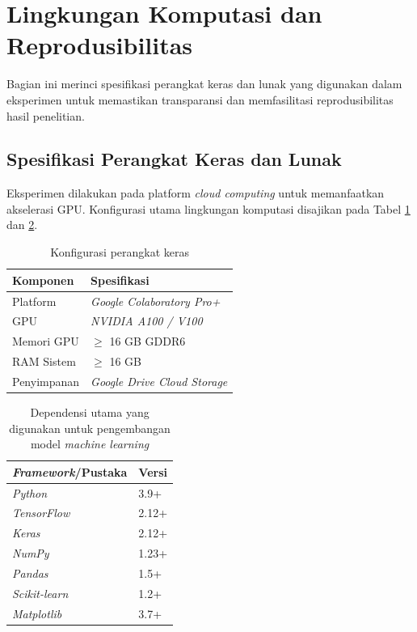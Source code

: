 \section{Lingkungan Komputasi dan Reprodusibilitas}

Bagian ini merinci spesifikasi perangkat keras dan lunak yang digunakan dalam eksperimen untuk memastikan transparansi dan memfasilitasi reprodusibilitas hasil penelitian.

\subsection{Spesifikasi Perangkat Keras dan Lunak}

Eksperimen dilakukan pada platform \textit{cloud computing} untuk memanfaatkan akselerasi GPU. Konfigurasi utama lingkungan komputasi disajikan pada Tabel \ref{tab:hardware_spec} dan \ref{tab:software_deps}.

\begin{table}[h]
\centering
\caption{Konfigurasi perangkat keras}
\label{tab:hardware_spec}
\begin{tabular}{|l|l|}
\hline
\textbf{Komponen} & \textbf{Spesifikasi} \\
\hline
Platform & \textit{Google Colaboratory Pro+} \\
GPU & \textit{NVIDIA A100 / V100} \\
Memori GPU & $\geq$ 16 GB GDDR6 \\
RAM Sistem & $\geq$ 16 GB \\
Penyimpanan & \textit{Google Drive Cloud Storage} \\
\hline
\end{tabular}
\end{table}

\begin{table}[h]
\centering
\caption{Dependensi utama yang digunakan untuk pengembangan model \textit{machine learning}}
\label{tab:software_deps}
\begin{tabular}{|l|l|}
\hline
\textbf{\textit{Framework}/Pustaka} & \textbf{Versi} \\
\hline
\textit{Python} & 3.9+ \\
\textit{TensorFlow} & 2.12+ \\
\textit{Keras} & 2.12+ \\
\textit{NumPy} & 1.23+ \\
\textit{Pandas} & 1.5+ \\
\textit{Scikit-learn} & 1.2+ \\
\textit{Matplotlib} & 3.7+ \\
\hline
\end{tabular}
\end{table}

